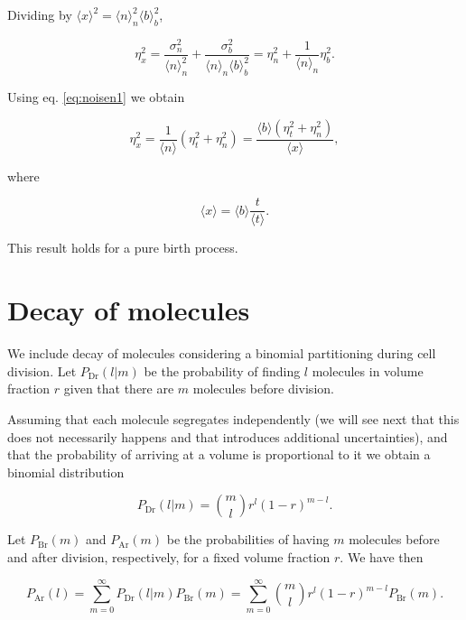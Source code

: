 Dividing by $\langle x\rangle^2=\langle n\rangle_n^2\langle b\rangle_b^2$,

\begin{equation*}
  \eta_x^2=\frac{\sigma_n^2}{\langle n\rangle_n^2} + \frac{\sigma_b^2}{\langle n\rangle_n\langle b\rangle_b^2} = \eta_n^2+\frac{1}{\langle n\rangle_n}\eta_b^2.
\end{equation*}

Using eq. \ref{eq:noisen1} we obtain

\begin{equation}
  \label{eq:noisex}
  \eta_x^2=\frac{1}{\langle n\rangle}\left(\eta_t^2+\eta_n^2\right)=\frac{\langle b\rangle\left(\eta_t^2+\eta_n^2\right)}{\langle x\rangle},
\end{equation}

where

\begin{equation}
  \langle x\rangle = \langle b\rangle\frac{t}{\langle t\rangle}.
\end{equation}

This result holds for a pure birth process.

\section{Decay of molecules}

We include decay of molecules considering a binomial partitioning during cell division. Let $P_\text{Dr}(l|m)$ be the probability of finding $l$ molecules in volume fraction $r$ given that there are $m$ molecules before division.

Assuming that each molecule segregates independently (we will see next that this does not necessarily happens and that introduces additional uncertainties), and that the probability of arriving at a volume is proportional to it we obtain a binomial distribution

\begin{equation}
  P_\text{Dr}(l|m) = {m\choose l}r^l(1-r)^{m-l}.
\end{equation}

Let $P_\text{Br}(m)$ and $P_\text{Ar}(m)$ be the probabilities of having $m$ molecules before and after division, respectively, for a fixed volume fraction $r$. We have then

\begin{equation}
  P_\text{Ar}(l) = \sum_{m=0}^\infty P_\text{Dr}(l|m)P_\text{Br}(m) = \sum_{m=0}^\infty {m\choose l}r^l(1-r)^{m-l}P_\text{Br}(m).
\end{equation}

